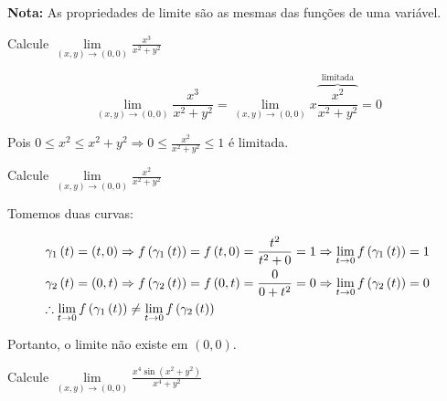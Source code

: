 \documentclass[11pt, oneside, a4paper]{gsm-l}
\begin{document}
\textbf{Nota:} As propriedades de limite são as mesmas das funções de uma variável.

\begin{exem}
    Calcule $\mathop {\lim }\limits_{\left( {x,y} \right) \to \left( {0,0} \right)} \frac{{x^3 }}{{x^2  + y^2 }}$
\end{exem}

\begin{sol}
\[
    \mathop {\lim }\limits_{\left( {x,y} \right) \to \left( {0,0} \right)} \frac{{x^3 }}{{x^2  + y^2 }} = \mathop {\lim }\limits_{\left( {x,y} \right) \to \left( {0,0} \right)} x\overbrace {\frac{{x^2 }}
{{x^2  + y^2 }}}^{{\text{limitada}}} = 0
\]

    Pois $0 \leqslant x^2  \leqslant x^2  + y^2  \Rightarrow 0 \leqslant \frac{{x^2 }}
{{x^2  + y^2 }} \leqslant 1$ é limitada.
\end{sol}

\begin{exem}
    Calcule $\mathop {\lim }\limits_{\left( {x,y} \right) \to \left( {0,0} \right)} \frac{{x^2 }}{{x^2  + y^2 }}$
\end{exem}

\begin{sol}
Tomemos duas curvas:

\[
\begin{gathered}
  \gamma _1 \left( t \right) = \left( {t,0} \right) \Rightarrow f\left( {\gamma _1 \left( t \right)} \right) = f\left( {t,0} \right) = \frac{{t^2 }}
{{t^2  + 0}} = 1 \Rightarrow \mathop {\lim }\limits_{t \to 0} f\left( {\gamma _1 \left( t \right)} \right) = 1 \hfill \\
  \gamma _2 \left( t \right) = \left( {0,t} \right) \Rightarrow f\left( {\gamma _2 \left( t \right)} \right) = f\left( {0,t} \right) = \frac{0}
{{0 + t^2 }} = 0 \Rightarrow \mathop {\lim }\limits_{t \to 0} f\left( {\gamma _2 \left( t \right)} \right) = 0 \hfill \\
  \therefore \mathop {\lim }\limits_{t \to 0} f\left( {\gamma _1 \left( t \right)} \right) \ne \mathop {\lim }\limits_{t \to 0} f\left( {\gamma _2 \left( t \right)} \right) \hfill \\
\end{gathered}
\]

Portanto, o limite não existe em $(0,0)$.
\end{sol}

\begin{exem}
    Calcule $\mathop {\lim }\limits_{\left( {x,y} \right) \to \left( {0,0} \right)} \frac{{x^4 \sin \left( {x^2  + y^2 } \right)}}{{x^4  + y^2 }}$
\end{exem}
\end{document}
